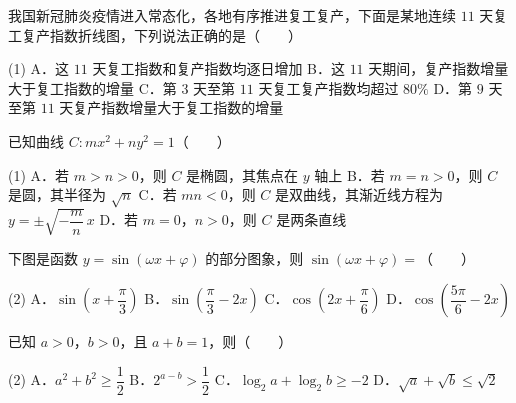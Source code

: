 \Needspace{0.4\textheight}
\begin{question}
我国新冠肺炎疫情进入常态化，各地有序推进复工复产，下面是某地连续 $11$ 天复工复产指数折线图，下列说法正确的是\mbox{（　　）}
\nopagebreak[4]
\begin{center}\end{center}
\nopagebreak[4]
\begin{gkopts}(1)
\task A．这 $11$ 天复工指数和复产指数均逐日增加
\task B．这 $11$ 天期间，复产指数增量大于复工指数的增量
\task C．第 $3$ 天至第 $11$ 天复工复产指数均超过 $80\%$
\task D．第 $9$ 天至第 $11$ 天复产指数增量大于复工指数的增量
\end{gkopts}

\end{question}
\begin{question}
已知曲线 $C:mx^{2}+ny^{2}=1$\mbox{（　　）}

\begin{gkopts}(1)
\task A．若 $m>n>0$，则 $C$ 是椭圆，其焦点在 $y$ 轴上
\task B．若 $m=n>0$，则 $C$ 是圆，其半径为 $\sqrt n$
\task C．若 $mn<0$，则 $C$ 是双曲线，其渐近线方程为 $y=\pm\sqrt{-\dfrac mn}\,x$
\task D．若 $m=0$，$n>0$，则 $C$ 是两条直线
\end{gkopts}

\Needspace{0.4\textheight}
\end{question}
\begin{question}
下图是函数 $y=\sin(\omega x+\varphi)$ 的部分图象，则 $\sin(\omega x+\varphi)=$\mbox{（　　）}
\nopagebreak[4]
\begin{center}\end{center}
\nopagebreak[4]
\begin{gkopts}(2)
\task A．$\sin\left(x+\dfrac\pi3\right)$
\task B．$\sin\left(\dfrac\pi3-2x\right)$
\task C．$\cos\left(2x+\dfrac\pi6\right)$
\task D．$\cos\left(\dfrac{5\pi}6-2x\right)$
\end{gkopts}

\end{question}
\begin{question}
已知 $a>0$，$b>0$，且 $a+b=1$，则\mbox{（　　）}

\begin{gkopts}(2)
\task A．$a^{2}+b^{2}\ge\dfrac12$
\task B．$2^{a-b}>\dfrac12$
\task C．$\log_2a+\log_2b\ge-2$
\task D．$\sqrt a+\sqrt b\le\sqrt2$
\end{gkopts}

\par\medskip

\end{question}

